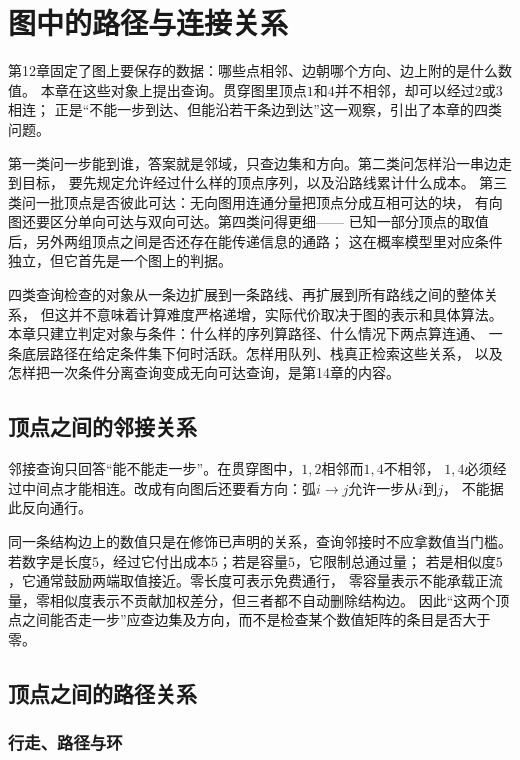 \chapter{图中的路径与连接关系}
\label{chap:graph-paths}

第12章固定了图上要保存的数据：哪些点相邻、边朝哪个方向、边上附的是什么数值。
本章在这些对象上提出查询。贯穿图里顶点$1$和$4$并不相邻，却可以经过$2$或$3$相连；
正是“不能一步到达、但能沿若干条边到达”这一观察，引出了本章的四类问题。

第一类问一步能到谁，答案就是邻域，只查边集和方向。第二类问怎样沿一串边走到目标，
要先规定允许经过什么样的顶点序列，以及沿路线累计什么成本。
第三类问一批顶点是否彼此可达：无向图用连通分量把顶点分成互相可达的块，
有向图还要区分单向可达与双向可达。第四类问得更细——
已知一部分顶点的取值后，另外两组顶点之间是否还存在能传递信息的通路；
这在概率模型里对应条件独立，但它首先是一个图上的判据。

四类查询检查的对象从一条边扩展到一条路线、再扩展到所有路线之间的整体关系，
但这并不意味着计算难度严格递增，实际代价取决于图的表示和具体算法。
本章只建立判定对象与条件：什么样的序列算路径、什么情况下两点算连通、
一条底层路径在给定条件集下何时活跃。怎样用队列、栈真正检索这些关系，
以及怎样把一次条件分离查询变成无向可达查询，是第14章的内容。

\section{顶点之间的邻接关系}

邻接查询只回答“能不能走一步”。在贯穿图中，$1,2$相邻而$1,4$不相邻，
$1,4$必须经过中间点才能相连。改成有向图后还要看方向：弧$i\to j$允许一步从$i$到$j$，
不能据此反向通行。

同一条结构边上的数值只是在修饰已声明的关系，查询邻接时不应拿数值当门槛。
若数字是长度$5$，经过它付出成本$5$；若是容量$5$，它限制总通过量；
若是相似度$5$，它通常鼓励两端取值接近。零长度可表示免费通行，
零容量表示不能承载正流量，零相似度表示不贡献加权差分，但三者都不自动删除结构边。
因此“这两个顶点之间能否走一步”应查边集及方向，而不是检查某个数值矩阵的条目是否大于零。

\section{顶点之间的路径关系}

\subsection{行走、路径与环}

